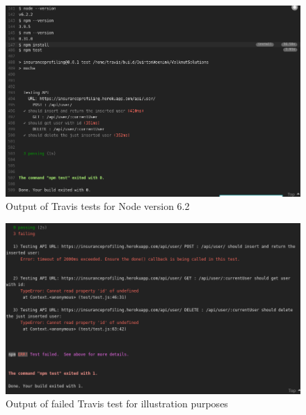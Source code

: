 \documentclass{article}
\begin{document}
\begin{figure}[H]
  \centering
      \includegraphics[width=\textwidth]{images/6_2.png}
  \caption{Output of Travis tests for Node version 6.2}
\end{figure}

\begin{figure}[H]
  \centering
      \includegraphics[width=\textwidth]{images/failed.png}
  \caption{Output of failed Travis test for illustration purposes}
\end{figure}
\end{document}
